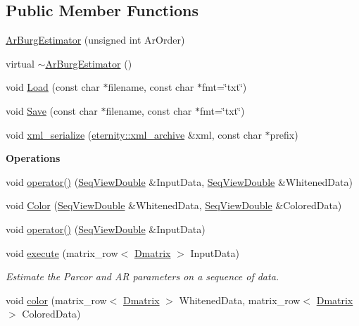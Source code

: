 \subsection*{Public Member Functions}
\begin{DoxyCompactItemize}
\item 
\hyperlink{classtsa_1_1_ar_burg_estimator_a6204df3016ce1f4aabf95fe4e05b27c4}{Ar\+Burg\+Estimator} (unsigned int Ar\+Order)
\item 
virtual \hyperlink{classtsa_1_1_ar_burg_estimator_a4b72f798ee5330d446366c4296aec27b}{$\sim$\+Ar\+Burg\+Estimator} ()
\item 
void \hyperlink{classtsa_1_1_ar_burg_estimator_a909ccc5f3ec7155ca60fb23122a8edfd}{Load} (const char $\ast$filename, const char $\ast$fmt=\char`\"{}txt\char`\"{})
\item 
void \hyperlink{classtsa_1_1_ar_burg_estimator_a5f666a51727cfd49d748973b8f050763}{Save} (const char $\ast$filename, const char $\ast$fmt=\char`\"{}txt\char`\"{})
\item 
void \hyperlink{classtsa_1_1_ar_burg_estimator_a2760a49fb1837ff81061ebf7431de0ef}{xml\+\_\+serialize} (\hyperlink{classeternity_1_1xml__archive}{eternity\+::xml\+\_\+archive} \&xml, const char $\ast$prefix)
\end{DoxyCompactItemize}
\begin{Indent}\textbf{ Operations}\par
\begin{DoxyCompactItemize}
\item 
void \hyperlink{classtsa_1_1_ar_burg_estimator_a904c4776668339798aa429622989dae6}{operator()} (\hyperlink{namespacetsa_ac599574bcc094eda25613724b8f3ca9e}{Seq\+View\+Double} \&Input\+Data, \hyperlink{namespacetsa_ac599574bcc094eda25613724b8f3ca9e}{Seq\+View\+Double} \&Whitened\+Data)
\item 
void \hyperlink{classtsa_1_1_ar_burg_estimator_a4c318ac037fabbad13f506e97576034a}{Color} (\hyperlink{namespacetsa_ac599574bcc094eda25613724b8f3ca9e}{Seq\+View\+Double} \&Whitened\+Data, \hyperlink{namespacetsa_ac599574bcc094eda25613724b8f3ca9e}{Seq\+View\+Double} \&Colored\+Data)
\item 
void \hyperlink{classtsa_1_1_ar_burg_estimator_a84c6368cebbbe6965e28769e406d4310}{operator()} (\hyperlink{namespacetsa_ac599574bcc094eda25613724b8f3ca9e}{Seq\+View\+Double} \&Input\+Data)
\item 
void \hyperlink{classtsa_1_1_ar_burg_estimator_aab366c108b53cb7d4ac5b76d5f6ac465}{execute} (matrix\+\_\+row$<$ \hyperlink{namespacetsa_ad260cd21c1891c4ed391fe788569aba4}{Dmatrix} $>$ Input\+Data)
\begin{DoxyCompactList}\small\item\em Estimate the Parcor and AR parameters on a sequence of data. \end{DoxyCompactList}\item 
void \hyperlink{classtsa_1_1_ar_burg_estimator_a3b6d9a2e792b5cd1abb9c8daadc15cac}{color} (matrix\+\_\+row$<$ \hyperlink{namespacetsa_ad260cd21c1891c4ed391fe788569aba4}{Dmatrix} $>$ Whitened\+Data, matrix\+\_\+row$<$ \hyperlink{namespacetsa_ad260cd21c1891c4ed391fe788569aba4}{Dmatrix} $>$ Colored\+Data)
\end{DoxyCompactItemize}
\end{Indent}
